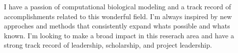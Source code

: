 \break
\begin{cvparagraph}
\par
{I have a passion of computational biological modeling and a track record of accomplishments related to this wonderful field. I'm always inspired by new approches and methods that consistently expand whats possible and whats known. I'm looking to make a broad impact in this reserach area and have a strong track record of leadership, scholarship, and project leadership. }
\end{cvparagraph}